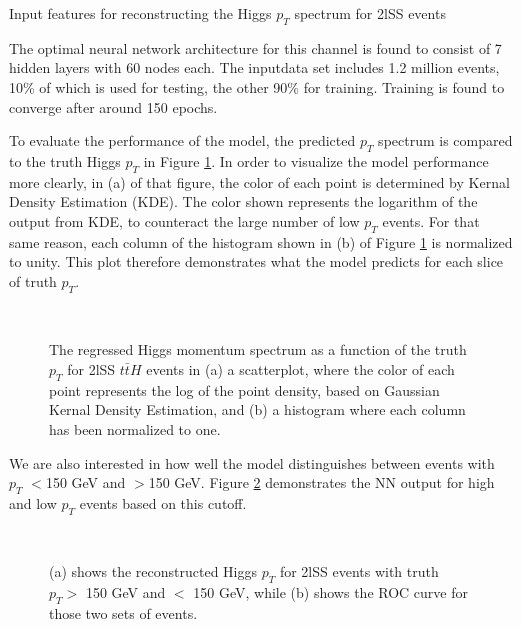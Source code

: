 \begin{table}[H]

  \caption{Input features for reconstructing the Higgs $p_T$ spectrum for 2lSS events}
  \label{tab:pt2lSSfeatures}
\end{table}

The optimal neural network architecture for this channel is found to consist of 7 hidden layers with 60 nodes each. The inputdata set includes 1.2 million events, 10\% of which is used for testing, the other 90\% for training. Training is found to converge after around 150 epochs. 

To evaluate the performance of the model, the predicted $p_T$ spectrum is compared to the truth Higgs $p_T$ in Figure \ref{fig:pt2lSSresults}. In  order to visualize the model performance more clearly, in (a) of that figure, the color of each point is determined by Kernal Density Estimation (KDE). The color shown represents the logarithm of the output from KDE, to counteract the large number of low $p_T$ events. For that same reason, each column of the histogram shown in (b) of Figure \ref{fig:pt2lSSresults} is normalized to unity. This plot therefore demonstrates what the model predicts for each slice of truth $p_T$.

\begin{figure}[H]
    \centering
    \\
    \caption{The regressed Higgs momentum spectrum as a function of the truth $p_T$ for 2lSS $t\bar{t}H$ events in (a) a scatterplot, where the color of each point represents the log of the point density, based on Gaussian Kernal Density Estimation, and (b) a histogram where each column  has been normalized to one.}
    \label{fig:pt2lSSresults}
\end{figure}

We are also interested in how well the model distinguishes between events with $p_T$ $<$150 GeV and $>$150 GeV. Figure \ref{fig:pt2lSSroc} demonstrates the NN output for high and low $p_T$ events based on this cutoff.

\begin{figure}[H]                                                                                                    
    \centering
    \\
    \caption{(a) shows the reconstructed Higgs $p_T$ for 2lSS events with truth $p_T > $ 150 GeV and $<$ 150 GeV, while (b) shows the ROC curve for those two sets of events.}
    \label{fig:pt2lSSroc}
\end{figure}
                                                                                                                            

